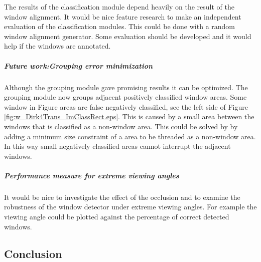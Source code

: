The results of the classification module depend heavily on the result of the
window alignment. It would be nice feature research to make an independent
evaluation of the classification modules.  This could be done with a random
window alignment generator. Some evaluation should be developed and it would
help if the windows are annotated.

\subparagraph{Future work:Grouping error minimization}
Although the grouping module gave promising results it can be optimized.  The
grouping module now groups adjacent positively classified window areas.  Some
window in Figure areas are false negatively classified, see the left side of
Figure \ref{fig:w_Dirk4Trans_ImClassRect.eps}.  This is caused by a small area
between the windows that is classified as a non-window area. This could be
solved by by adding a minimum size constraint of a area to be threaded as a
non-window area.  In this way small negatively classified areas cannot interrupt
the adjacent windows.

\subparagraph{Performance measure for extreme viewing angles}
It would be nice to investigate the effect of the occlusion and to examine the
robustness of the window detector under extreme viewing angles.
For example the viewing angle could be plotted against the percentage of
correct detected windows.







\subsection{Conclusion}



